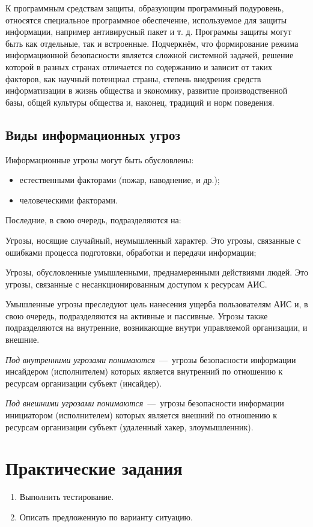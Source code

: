 К программным средствам защиты, образующим программный подуровень, относятся
специальное программное обеспечение, используемое для защиты информации,
например антивирусный пакет и т. д. Программы защиты могут быть как
отдельные, так и встроенные. Подчеркнём, что формирование режима
информационной безопасности является сложной системной задачей, решение
которой в разных странах отличается по содержанию и зависит от таких
факторов, как научный потенциал страны, степень внедрения средств
информатизации в жизнь общества и экономику, развитие производственной базы,
общей культуры общества и, наконец, традиций и норм поведения.

\subsection{Виды информационных угроз}
\noindent Информационные угрозы могут быть обусловлены:
\begin{itemize}[noitemsep]
  \item естественными факторами (пожар, наводнение, и др.);
  \item человеческими факторами.
\end{itemize}
\noindent Последние, в свою очередь, подразделяются на:
\begin{Notes}
  \item Угрозы, носящие случайный, неумышленный характер. Это
      угрозы, связанные с ошибками процесса подготовки, обработки и
      передачи информации;
  \item Угрозы, обусловленные умышленными, преднамеренными
      действиями людей. Это угрозы, связанные с несанкционированным
      доступом к ресурсам АИС.
\end{Notes}
Умышленные угрозы преследуют цель нанесения ущерба пользователям АИС и, в
свою очередь, подразделяются на активные и пассивные. Угрозы также
подразделяются на внутренние, возникающие внутри управляемой организации, и
внешние.

\emph{Под внутренними угрозами понимаются}~---~угрозы безопасности информации
инсайдером (исполнителем) которых является внутренний по отношению к ресурсам
организации субъект (инсайдер).

\emph{Под внешними угрозами понимаются}~---~угрозы безопасности информации
инициатором (исполнителем) которых является внешний по отношению к ресурсам
организации субъект (удаленный хакер, злоумышленник).



\section{Практические задания}\label{sect1_b}
%
\begin{enumerate}
\item Выполнить тестирование. %
\item Описать предложенную по варианту ситуацию.
\end{enumerate}

